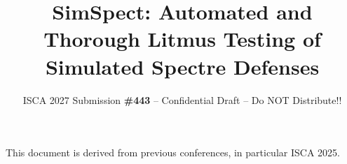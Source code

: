 \documentclass[sigconf, screen, review]{acmart}
\newcommand{\iscasubmissionnumber}{443}
\begin{document}
\title{SimSpect: Automated and Thorough Litmus Testing of  Simulated Spectre Defenses}

\author{ISCA 2027 Submission
  \textbf{\#\iscasubmissionnumber} -- Confidential Draft -- Do NOT Distribute!!}
\renewcommand{\shortauthors}{ISCA 2027 Submission \#\iscasubmissionnumber}

\begin{abstract}

\end{abstract}

\maketitle









\begin{acks}
This document is derived from previous conferences, in particular ISCA 2025.
\end{acks}



\end{document}
